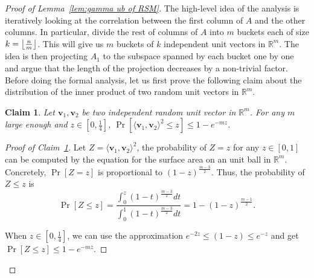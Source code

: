 \documentclass[11pt]{article}
\newtheorem{claim}{Claim}[lemma]
\theoremstyle{remark}
\theoremstyle{definition}
\DeclarePairedDelimiter\floor{\lfloor}{\rfloor}
\newcommand{\bv}{\mathbf{v}}
\newcommand{\R}{{\mathbb R}} %
\begin{document}
\begin{proof}[Proof of Lemma~\ref{lem:gamma ub of RSM}]
	The high-level idea of the analysis is iteratively looking at the correlation between the first column of $A$ and the other columns. In particular, divide the rest of columns of $A$ into $m$ buckets each of size $k=\floor*{\frac{n}{m}}$. This will give us $m$ buckets of $k$ independent unit vectors in $\R^m$. The idea is then projecting $A_1$ to the subspace spanned by each bucket one by one and argue that the length of the projection decreases by a non-trivial factor. Before doing the formal analysis, let us first prove the following claim about the distribution of the inner product of two random unit vectors in $\R^m$.
	
	\begin{claim}\label{claim:inner product of random unit vector}
		Let $\bv_1,\bv_2$ be two independent random unit vector in $\R^m$. For any $m$ large enough and $z\in[0,\frac{1}{4}]$, $\Pr[\langle\bv_1,\bv_2\rangle^2\leq z]\leq1-e^{-mz}$. 
	\end{claim}
	\begin{proof}[Proof of Claim~\ref{claim:inner product of random unit vector}]
		Let $Z=\langle\bv_1,\bv_2\rangle^2$, the probability of $Z= z$ for any $z\in[0,1]$ can be computed by the equation for the surface area on an unit ball in $\R^m$. Concretely, $\Pr[Z= z]$ is proportional to $(1-z)^{\frac{m-3}{2}}$. Thus, the probability of $Z\leq z$ is
		$$
		\Pr[Z\leq z] = \frac{\int_0^z (1-t)^{\frac{m-3}{2}}dt}{\int_0^1(1-t)^{\frac{m-3}{2}}dt} = 1-(1-z)^{\frac{m-1}{2}}.
		$$
		
		When $z\in[0,\frac{1}{4}]$, we can use the approximation $e^{-2z}\leq(1-z)\leq e^{-z}$ and get $\Pr[Z\leq z]\leq1-e^{-mz}$.
	\end{proof}
	

\end{proof}
\end{document}
